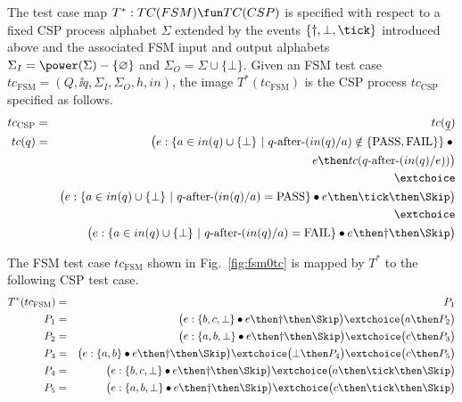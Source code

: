 The test case map $T^* :TC(FSM) \fun TC(CSP)$ is specified with respect to a fixed
CSP process alphabet $\Sigma$ extended by the events $\{\dag,\bot,\tick \}$ introduced
above
and the associated FSM input and output alphabets
$\Sigma_I = \power(\Sigma)-\{\varnothing\}$ and $\Sigma_O=\Sigma\cup \{\bot \}$.
Given an FSM test case $tc_\text{FSM}=(Q,\ii q,\Sigma_I,\Sigma_O,h,in)$, 
the image $T^*(tc_\text{FSM})$ is the CSP process $tc_\text{CSP}$ specified 
as follows.
\begin{eqnarray*}
tc_\text{CSP} & = & tc(\ii q)
\\
tc(q) & = & \big( e : \{ a\in in(q)\cup\{\bot\}~|~q\after (in(q)/a)\notin \{\text{PASS},\text{FAIL}\} \} \bullet {}
\\ & & \tabd
e \then tc(q\after (in(q)/e)) \big)
\\ & & \extchoice
\\ & & \big( e : \{ a\in in(q)\cup\{\bot\}~|~q\after(in(q)/a) = \text{PASS} \} \bullet e \then \tick \then \Skip \big)
\\ & & \extchoice
\\ & & \big( e : \{ a\in in(q)\cup\{\bot\}~|~q\after(in(q)/a) = \text{FAIL} \} \bullet e \then \dag \then \Skip \big)
\end{eqnarray*}


\begin{example}
The FSM test case $tc_\text{FSM}$
shown in Fig.~\ref{fig:fsm0tc} is mapped by $T^*$ to the following
CSP test case.
\begin{eqnarray*}
T^*(tc_\text{FSM}) & = & P_1
\\
P_1 & = & \big(e:\{ b,c,\bot \} \bullet e \then \dag\then\Skip\big)
\extchoice
 \big( a \then P_2 \big) 
\\
P_2 & = & \big( e : \{ a,b,\bot \}\bullet e\then \dag\then\Skip  \big)
\extchoice
\big( c\then P_3 \big)
\\
P_3 & = & \big( e : \{ a,b \}\bullet e\then \dag\then\Skip  \big)
\extchoice
\big( \bot \then P_4 \big)
\extchoice
\big( c\then P_5 \big)
\\
P_4 & = & \big( e : \{ b,c,\bot \}\bullet e\then \dag\then\Skip  \big)
\extchoice
\big( a\then\tick\then \Skip \big)
\\
P_5 & = & \big( e : \{ a,b,\bot \}\bullet e\then \dag\then\Skip  \big)
\extchoice
\big( c\then\tick\then \Skip \big)
\end{eqnarray*}
\xbox
\end{example}

